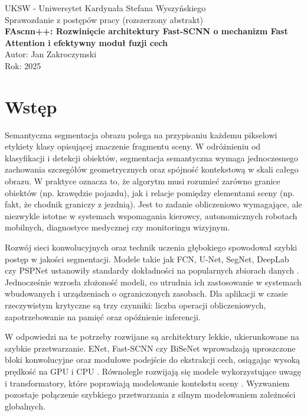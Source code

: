 \documentclass[12pt,oneside,a4paper]{report}
\newcommand{\autor}{Jan Zakroczymski}
\newcommand{\tytul}{FAscnn++: Rozwinięcie architektury Fast-SCNN o mechanizm Fast Attention i efektywny moduł fuzji cech}
\newcommand{\uczelnia}{UKSW - Uniwersytet Kardynała Stefana Wyszyńskiego}
\newcommand{\rok}{2025}
\begin{document}
\begin{titlepage}
  \begin{center}
    {\Large \uczelnia \\[0.5cm]}
    {\Large Sprawozdanie z postępów pracy (rozszerzony abstrakt)}\\[1.5cm]
    {\LARGE \textbf{\tytul}}\\[1.5cm]
    {\large Autor: \autor}\\[0.2cm]
    {\large Rok: \rok}\\[2cm]
  \end{center}
\end{titlepage}

\tableofcontents

\chapter{Wstęp}
Semantyczna segmentacja obrazu polega na przypisaniu każdemu pikselowi etykiety
klasy opisującej znaczenie fragmentu sceny. W odróżnieniu od klasyfikacji i
detekcji obiektów, segmentacja semantyczna wymaga jednoczesnego zachowania
szczegółów geometrycznych oraz spójność kontekstową w skali całego obrazu.
W praktyce oznacza to, że algorytm musi rozumieć zarówno granice obiektów
(np. krawędzie pojazdu), jak i relacje pomiędzy elementami sceny (np. fakt, że
chodnik graniczy z jezdnią). Jest to zadanie obliczeniowo wymagające, ale
niezwykle istotne w systemach wspomagania kierowcy, autonomicznych robotach
mobilnych, diagnostyce medycznej czy monitoringu wizyjnym.

Rozwój sieci konwolucyjnych oraz technik uczenia głębokiego spowodował szybki
postęp w jakości segmentacji. Modele takie jak FCN, U-Net, SegNet, DeepLab czy
PSPNet ustanowiły standardy dokładności na popularnych zbiorach danych
\parencite{long2015fully,ronneberger2015u,badrinarayanan2017segnet,chen2018deeplab,zhao2017pspnet}.
Jednocześnie wzrosła złożoność modeli, co utrudnia ich zastosowanie w systemach
wbudowanych i urządzeniach o ograniczonych zasobach. Dla aplikacji w czasie
rzeczywistym krytyczne są trzy czynniki: liczba operacji obliczeniowych,
zapotrzebowanie na pamięć oraz opóźnienie inferencji.

W odpowiedzi na te potrzeby rozwijane są architektury lekkie, ukierunkowane na
szybkie przetwarzanie. ENet, Fast-SCNN czy BiSeNet wprowadzają uproszczone bloki
konwolucyjne oraz modułowe podejście do ekstrakcji cech, osiągając wysoką
prędkość na GPU i CPU \parencite{paszke2016enet,mehta2019fast,yu2018bisenet}.
Równolegle rozwijają się modele wykorzystujące uwagę i transformatory, które
poprawiają modelowanie kontekstu sceny \parencite{vaswani2017attention,dosovitskiy2020vit,xie2021segformer}.
Wyzwaniem pozostaje połączenie szybkiego przetwarzania z silnym modelowaniem
zależności globalnych.
\end{document}
